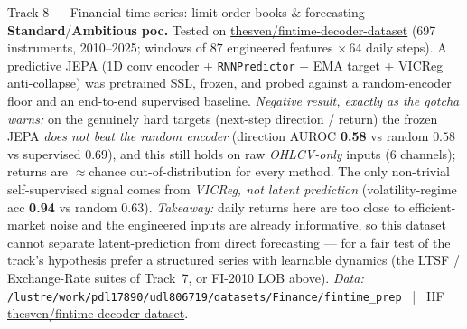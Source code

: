 \documentclass{article}
\newcommand{\code}[1]{\texttt{\small #1}}
\newcommand{\diffmed}{\colorbox{ebamber!18}{\textcolor{ebamber}{\small\bfseries Standard}}}
\newcommand{\diffhard}{\colorbox{ebred!15}{\textcolor{ebred}{\small\bfseries Ambitious}}}
\begin{document}
\begin{trackbox}{Track 8 --- Financial time series: limit order books \& forecasting \hfill \diffmed{}/\diffhard{}}
\smallskip
\textbf{poc.} Tested on
\href{https://huggingface.co/datasets/thesven/fintime-decoder-dataset}{thesven/fintime-decoder-dataset}
(697 instruments, 2010--2025; windows of $87$ engineered features $\times\,64$ daily steps).
A predictive JEPA (1D conv encoder + \code{RNNPredictor} + EMA target + VICReg anti-collapse)
was pretrained SSL, frozen, and probed against a random-encoder floor and an end-to-end
supervised baseline. \emph{Negative result, exactly as the gotcha warns:} on the genuinely
hard targets (next-step direction / return) the frozen JEPA \emph{does not beat the random
encoder} (direction AUROC \textbf{0.58} vs random $0.58$ vs supervised $0.69$), and this
still holds on raw \emph{OHLCV-only} inputs (6 channels); returns are $\approx$chance
out-of-distribution for every method. The only non-trivial self-supervised signal comes
from \emph{VICReg, not latent prediction} (volatility-regime acc \textbf{0.94} vs random
$0.63$). \emph{Takeaway:} daily returns here are too close to efficient-market noise and the
engineered inputs are already informative, so this dataset cannot separate latent-prediction
from direct forecasting --- for a fair test of the track's hypothesis prefer a structured
series with learnable dynamics (the LTSF / Exchange-Rate suites of Track~7, or FI-2010 LOB
above).
\emph{Data:} \code{/lustre/work/pdl17890/udl806719/datasets/Finance/fintime\_prep}
~|~ HF \href{https://huggingface.co/datasets/thesven/fintime-decoder-dataset}{thesven/fintime-decoder-dataset}.
\end{trackbox}
\end{document}
